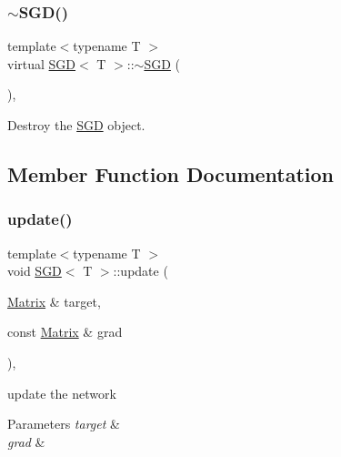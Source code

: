 \subsubsection{\texorpdfstring{$\sim$SGD()}{~SGD()}}
{\footnotesize\ttfamily template$<$typename T $>$ \\
virtual \mbox{\hyperlink{class_s_g_d}{S\+GD}}$<$ T $>$\+::$\sim$\mbox{\hyperlink{class_s_g_d}{S\+GD}} (\begin{DoxyParamCaption}{ }\end{DoxyParamCaption})\hspace{0.3cm}{\ttfamily [virtual]}, {\ttfamily [default]}}



Destroy the \mbox{\hyperlink{class_s_g_d}{S\+GD}} object. 



\subsection{Member Function Documentation}
\mbox{\label{class_s_g_d_a0345cfa977a251c576096ea6a098230f}} 
\subsubsection{\texorpdfstring{update()}{update()}}
{\footnotesize\ttfamily template$<$typename T $>$ \\
void \mbox{\hyperlink{class_s_g_d}{S\+GD}}$<$ T $>$\+::update (\begin{DoxyParamCaption}\item[{\mbox{\hyperlink{class_s_g_d_a0c157dbad2dc900c00b9ca57f23ba676}{Matrix}} \&}]{target,  }\item[{const \mbox{\hyperlink{class_s_g_d_a0c157dbad2dc900c00b9ca57f23ba676}{Matrix}} \&}]{grad }\end{DoxyParamCaption})\hspace{0.3cm}{\ttfamily [override]}, {\ttfamily [virtual]}}



update the network 


\begin{DoxyParams}{Parameters}
{\em target} & \\
\hline
{\em grad} & \\
\hline
\end{DoxyParams}


